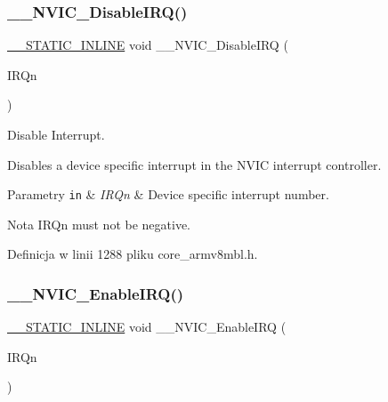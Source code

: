 \subsubsection{\texorpdfstring{\+\_\+\+\_\+\+N\+V\+I\+C\+\_\+\+Disable\+I\+R\+Q()}{\_\_NVIC\_DisableIRQ()}}
{\footnotesize\ttfamily \hyperlink{cmsis__iccarm_8h_aba87361bfad2ae52cfe2f40c1a1dbf9c}{\+\_\+\+\_\+\+S\+T\+A\+T\+I\+C\+\_\+\+I\+N\+L\+I\+NE} void \+\_\+\+\_\+\+N\+V\+I\+C\+\_\+\+Disable\+I\+RQ (\begin{DoxyParamCaption}\item[{\hyperlink{group___peripheral__interrupt__number__definition_ga7e1129cd8a196f4284d41db3e82ad5c8}{I\+R\+Qn\+\_\+\+Type}}]{I\+R\+Qn }\end{DoxyParamCaption})}



Disable Interrupt. 

Disables a device specific interrupt in the N\+V\+IC interrupt controller. 
\begin{DoxyParams}[1]{Parametry}
\mbox{\tt in}  & {\em I\+R\+Qn} & Device specific interrupt number. \\
\hline
\end{DoxyParams}
\begin{DoxyNote}{Nota}
I\+R\+Qn must not be negative. 
\end{DoxyNote}


Definicja w linii 1288 pliku core\+\_\+armv8mbl.\+h.

\mbox{\label{group___c_m_s_i_s___core___n_v_i_c_functions_ga71227e1376cde11eda03fcb62f1b33ea}} 
\subsubsection{\texorpdfstring{\+\_\+\+\_\+\+N\+V\+I\+C\+\_\+\+Enable\+I\+R\+Q()}{\_\_NVIC\_EnableIRQ()}}
{\footnotesize\ttfamily \hyperlink{cmsis__iccarm_8h_aba87361bfad2ae52cfe2f40c1a1dbf9c}{\+\_\+\+\_\+\+S\+T\+A\+T\+I\+C\+\_\+\+I\+N\+L\+I\+NE} void \+\_\+\+\_\+\+N\+V\+I\+C\+\_\+\+Enable\+I\+RQ (\begin{DoxyParamCaption}\item[{\hyperlink{group___peripheral__interrupt__number__definition_ga7e1129cd8a196f4284d41db3e82ad5c8}{I\+R\+Qn\+\_\+\+Type}}]{I\+R\+Qn }\end{DoxyParamCaption})}




